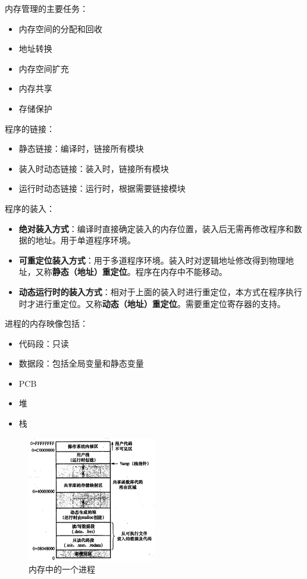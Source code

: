 \documentclass[12pt, a4paper, oneside]{ctexart}
\begin{document}
内存管理的主要任务：
\begin{itemize}
  \item 内存空间的分配和回收
  \item 地址转换
  \item 内存空间扩充
  \item 内存共享
  \item 存储保护
\end{itemize}

程序的链接：
\begin{itemize}
  \item 静态链接：编译时，链接所有模块
  \item 装入时动态链接：装入时，链接所有模块
  \item 运行时动态链接：运行时，根据需要链接模块
\end{itemize}

程序的装入：
\begin{itemize}
  \item \textbf{绝对装入方式}：编译时直接确定装入的内存位置，装入后无需再修改程序和数据的地址。用于单道程序环境。
  \item \textbf{可重定位装入方式}：用于多道程序环境。装入时对逻辑地址修改得到物理地址，又称\textbf{静态（地址）重定位}。程序在内存中不能移动。
  \item \textbf{动态运行时的装入方式}：相对于上面的装入时进行重定位，本方式在程序执行时才进行重定位。又称\textbf{动态（地址）重定位}。需要重定位寄存器的支持。
\end{itemize}

进程的内存映像包括：
\begin{itemize}
  \item 代码段：只读
  \item 数据段：包括全局变量和静态变量
  \item PCB
  \item 堆
  \item 栈
\end{itemize}

\begin{figure}
  \centering
  \includegraphics[width=0.5\textwidth]{./images/process_in_memory.png}
  \caption{内存中的一个进程}
\end{figure}
\end{document}
